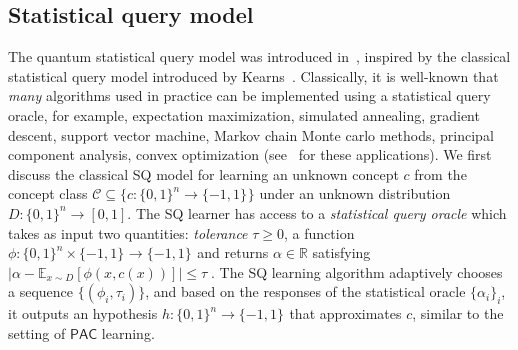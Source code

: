 \documentclass[11pt]{article}
\newcommand{\Exp}{\mathbb{E}}
\newcommand{\Cc}{\ensuremath{\mathcal{C}}}
\def\01{\{0,1\}}
\newcommand{\pmset}[1]{\{-1,1\}^{#1}} %
\newcommand{\R}{\ensuremath{\mathbb{R}}}
\newcommand{\PAC}{\ensuremath{\mathsf{PAC}}}
\def\01{\{0,1\}}
\begin{document}
\subsection{Statistical query model}
\label{sec:sqlearning}
The quantum statistical query model was introduced in~\cite{arunachalam2020quantum}, inspired by the classical statistical query model introduced by Kearns~\cite{kearns:statistical}. Classically, it is well-known that \emph{many} algorithms used in practice can be implemented using a statistical query oracle, for example, expectation maximization, simulated annealing, gradient descent, support vector machine, Markov chain Monte carlo methods, principal component analysis, convex optimization (see~\cite{reyzin2020statistical,feldman2017statistical} for these applications).  We first discuss the classical SQ model for learning an unknown concept $c$ from the concept class  $\Cc\subseteq \{c:\01^n\rightarrow \pmset{} \}$  under an unknown distribution $D:\01^n\rightarrow [0,1]$. The SQ learner  has access to a \emph{statistical query oracle} which takes as input two quantities:  \emph{tolerance} $\tau \geq 0$, a function $\phi:\01^n\times \pmset{}\rightarrow \pmset{}$ and returns $\alpha\in \R$ satisfying 
	$ 
	\Big |\alpha - \Exp_{x\sim D}[\phi(x,c(x))] \Big | \leq \tau\;.
	$
	The SQ learning algorithm adaptively chooses a sequence $\{ (\phi_i,\tau_i) \}$, and based on the responses of the statistical oracle $\{\alpha_i\}_i$,  it outputs an hypothesis $h:\01^n\rightarrow \pmset{}$ that approximates $c$, similar to the setting of $\PAC$ learning. 
\end{document}

